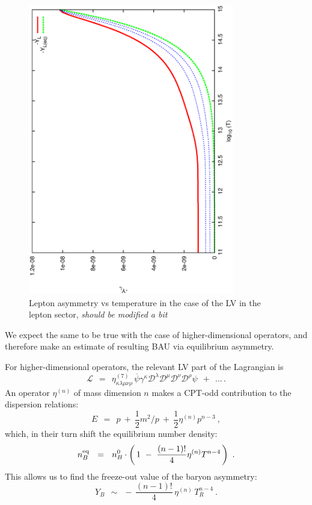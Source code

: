 \documentclass[12pt]{revtex4}
\newcommand{\eq}{{\rm eq}}
\newcommand{\mc}[1]{\mathcal{#1}}
\newcommand{\md}{\mathcal{D}}
\newcommand{\ov}{\overline}
\begin{document}
\begin{figure}
\includegraphics[width=9cm,angle=270]{l_dom_asymm_bau.ps}
\caption{Lepton asymmetry vs temperature in the case of the LV in the lepton sector, {\it should be modified a bit}}
\label{l_dom_asymm_bau}
\end{figure}
	We expect the same to be true with the case of higher-dimensional
	operators, and therefore make an estimate of resulting BAU 
	via equilibrium asymmetry.


	For higher-dimensional operators, the relevant LV part of the 
	Lagrangian is
\[
	\mc{L} ~~=~~ \eta^{(7)}_{\kappa\lambda\mu\nu\rho}\,
	\ov{\psi} \gamma^\kappa \md^\lambda \md^\mu \md^\nu \md^\rho \psi
	~~+~~ ...\,.
\]
	An operator $ \eta^{(n)} $ of mass dimension $ n $ makes a CPT-odd contribution to
	the dispersion relations:
\begin{equation}
\label{disp_rel_n}
	E ~~=~~ p ~+~ \frac 12 m^2/p ~+~ \frac 12 \eta^{(n)} p^{n-3}~,
\end{equation}
	which, in their turn shift the equilibrium number density:
\[
	n_B^\eq ~~=~~ n_B^0 \cdot \left(\, 1 ~-~ \frac{(n-1)!}{4} \eta^{(n)} T^{n-4}
					\,\right)~.
\]
	This allows us to find the freeze-out value of the baryon asymmetry:
\begin{equation}
\label{Y_B_n}
	Y_B ~~\sim~~ -\, \frac{(n-1)!}{4} \, \eta^{(n)} \,T^{n-4}_R~.
\end{equation}
	
\end{document}
